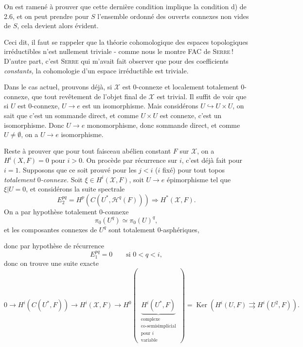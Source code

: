 \documentclass[11pt]{article}
\newcommand{\printedpage}[1]{\marginpar{\footnotesize p.~#1}}
\newcommand{\msp}[1]{\marginpar{\footnotesize [#1]}}
\newcommand{\Ker}{\operatorname{Ker}}
\begin{document}
\printedpage{19}

On est ramené à prouver que cette dernière condition implique la condition d) de 2.6, et on peut prendre pour $S$ l'ensemble ordonné des ouverts connexes non vides de $S$, cela devient alors évident.

Ceci dit, il faut se rappeler que la théorie cohomologique des espaces topologiques irréductibles n'est nullement triviale - comme nous le montre FAC de \textsc{Serre}\,! D'autre part, c'est \textsc{Serre} qui m'avait fait observer que pour des coefficients \textit{constants,} la cohomologie d'un espace irréductible est triviale.

Dans le cas actuel, prouvons déjà, si $\mathcal{X}$ est 0-connexe et localement totalement 0-connexe, que tout revêtement de l'objet final de $\mathcal{X}$ est trivial. Il suffit de voir que si $U$ est 0-connexe, $U \longrightarrow e$ est un isomorphisme. Mais considérons $U \hookrightarrow U \times U$, on sait que c'est un sommande direct, et comme $U \times U$ est connexe, c'est un isomorphisme. Donc $U \longrightarrow e$ monomorphisme, donc sommande direct, et comme $U \neq \emptyset$, on a $U \longrightarrow e$ isomorphisme.

Reste à prouver que pour tout faisceau \msp{page 31} abélien constant $F$ sur $\mathcal{X}$, on a $H^i(X,F)=0$ pour $i>0$. On procède par récurrence sur $i$, c'est déjà fait pour $i=1$. Supposons que ce soit prouvé pour les $j<i$ ($i$ fixé) pour tout topos \textit{totalement} 0\textit{-connexe.} Soit $\xi \in H^i(\mathcal{X},F)$, soit $U \longrightarrow e$ épimorphisme tel que $\xi|U=0$, et considérons la suite spectrale %
\[
E_2^{pq} = H^p(C(U^*,\mathcal{H}^q(F))) \Longrightarrow H^*(\mathcal{X},F).
\]
On a par hypothèse totalement 0-connexe
\[
\pi_0(U^q) \simeq \pi_0(U)^q, \tag*{$(*)$}
\]
et les composantes connexes de $U^q$ sont totalement 0-asphériques,
\begin{center}
\end{center}
donc par hypothèse de récurrence
\[
E_1^{pq} = 0 \qquad \text{si } 0<q<i,
\]
donc on trouve une suite exacte
\[
0 \longrightarrow H^i(C(U^*,F)) \longrightarrow H^i(\mathcal{X},F) \longrightarrow H^0(\ \underbrace{H^i(U^*,F)}_{\substack{\text{complexe}\\ \text{co-semisimplicial}\\ \text{pour } i\\ \text{variable}}}\ ) = \Ker(H^i(U,F) \rightrightarrows H^i(U^2,F)).
\]
\end{document}
